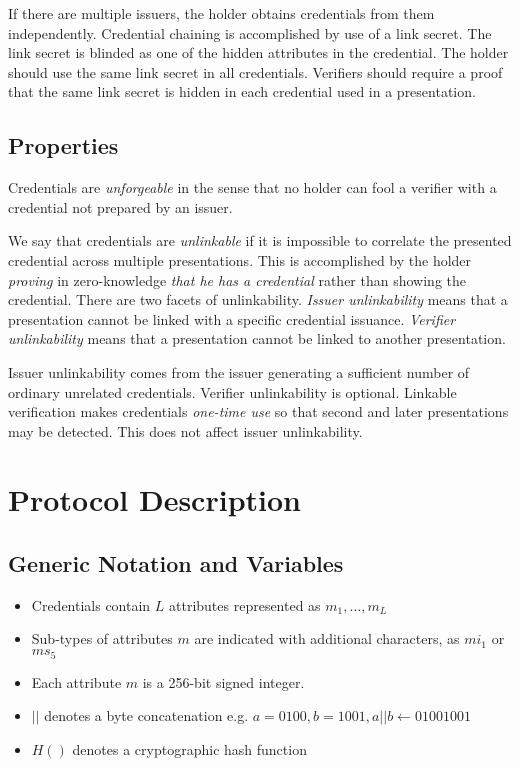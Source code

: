 \documentclass[a4paper]{article}
\begin{document}
If there are multiple issuers, the holder obtains credentials from them independently. Credential chaining is accomplished by use of a link secret. The link secret is blinded as one of the hidden attributes in the credential. The holder should use the same link secret in all credentials. Verifiers should require a proof that the same link secret is hidden in each credential used in a presentation. 

\subsection{Properties}

Credentials are \emph{unforgeable} in the sense that no holder can fool a verifier with a credential not prepared by an issuer.

We say that credentials are \emph{unlinkable} if it is impossible to correlate the presented credential across multiple presentations. This is accomplished by the holder \emph{proving} in zero-knowledge \emph{that he has a credential} rather than showing the credential. There are two facets of unlinkability. \emph{Issuer unlinkability} means that a presentation cannot be linked with a specific credential issuance. \emph{Verifier unlinkability} means that a presentation cannot be linked to another presentation.

Issuer unlinkability comes from the issuer generating a sufficient number of ordinary unrelated credentials. Verifier unlinkability is optional. Linkable verification makes credentials \emph{one-time use} so that second and later presentations may be detected. This does not affect issuer unlinkability.

\section{Protocol Description}
\subsection{Generic Notation and Variables}
\begin{itemize}
    \item Credentials contain $L$ attributes represented as $m_1,\dots,m_L$
    \item Sub-types of attributes $m$ are indicated with additional characters, as $mi_1$ or $ms_5$
    \item Each attribute $m$ is a 256-bit signed integer. 
    \item $||$ denotes a byte concatenation e.g. $a = 0100, b=1001, a||b \leftarrow 01001001$
    \item $H()$ denotes a cryptographic hash function
\end{itemize}
\end{document}
